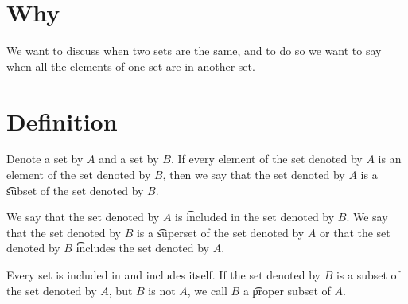 
\section*{Why}

We want to discuss when two sets are the same, and to do so we want to say when all the elements of one set are in another set.

\section*{Definition}

Denote a set by $A$ and a set by $B$.
If every element of the set denoted by $A$ is an element of the set denoted by $B$, then we say that the set denoted by $A$ is a \t{subset} of the set denoted by $B$.

We say that the set denoted by $A$ is \t{included} in the set denoted by $B$.
We say that the set denoted by $B$ is a \t{superset} of the set denoted by $A$ or that the set denoted by $B$ \t{includes} the set denoted by $A$.

Every set is included in and includes itself.
If the set denoted by $B$ is a subset of the set denoted by $A$, but $B$ is not $A$, we call $B$ a \t{proper subset} of $A$.

